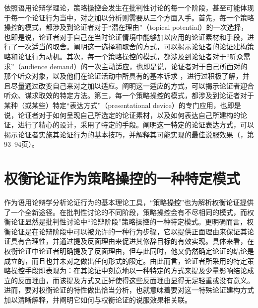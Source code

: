 \documentclass[b5paper,10.5pt,onecolumn,twoside,UTF8]{article}
\begin{document}
依照语用论辩学理论，策略操控会发生在批判性讨论的每一个阶段，甚至可能体现于每一个论证行为当中，对之加以分析则需要从三个方面入手。首先，每一个策略操控的模式，都涉及到论证者对于“潜在理由”（topical potential）的一次选择，也即是说，论证者对于自己在当时论证情境中能够加以应用的论证素材和手段，进行了一次适当的取舍。阐明这一选择和取舍的方式，可以揭示论证者的论证建构策略和论证行为动机。其次，每一个策略操控的模式，都涉及到论证者对于“听众需求”（audience demand）的一次主动适应，也即是说，论证者对于自己所面对的那个听众对象，以及他们在论证活动中所具有的基本诉求
，进行过积极了解，并且尽量通过改变自己来对之加以适应。阐明这一适应的方式，可以揭示论证者迎合听众、谋求取效的特定方法。第三，每一个策略操控的模式，都涉及到论证者对于某种（或某些）特定“表达方式”（presentational device）的专门应用，也即是说，论证者对于如何呈现自己所选定的论证素材，以及如何表达自己所建构的论证，进行了精心的设计，采用了特定的手段。阐明这一特定的论证表达方式，可以揭示论证者实施其论证行为的基本技巧，并解释其可能实现的最佳说服效果（\parencite{a4}，第93--94页）。

\vspace{-0.5em}

\section{权衡论证作为策略操控的一种特定模式}

\vspace{-0.5em}

作为语用论辩学分析论证行为的基本理论工具，“策略操控”也为解析权衡论证提供了一个全新途径。在批判性讨论的不同阶段，策略操控会有不尽相同的模式，而权衡论证显然是批判性讨论中“论辩阶段”策略操控的一种特定模式。更明确而言，权衡论证是在论辩阶段中可以被允许的一种行为步骤，它以提供正面理由来保证其论证具有合理性，并通过提及反面理由来促进其修辞目标的有效实现。具体来看，在权衡论证中论证者明确提及了反面理由，但与此同时，他又仍然确定论证的结论是成立的，而且也并未对之做出任何形式的限定。由此而言，论证者所采用的特定策略操控手段即表现为：在其论证中刻意地以一种特定的方式来提及少量影响结论成立的反面理由，而该提及方式又正好使得这些反面理由显得无足轻重或没有意义。进而，要对权衡论证的特性做出恰当分析，也就意味着要对这一特殊论证建构方式加以清晰解释，并阐明它如何与权衡论证的说服效果相关联。
\end{document}
